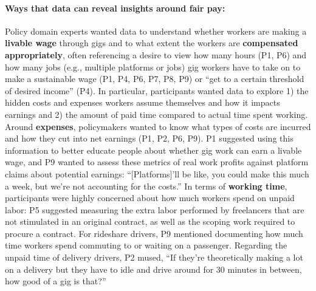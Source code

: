 \paragraph{{Ways that data can reveal insights around} fair pay: }\label{h.k49wp92meqn4}
{Policy domain experts} wanted data to understand {whether workers are making a \textbf{livable wage} through gig{s}} and to what extent the workers are \textbf{compensated appropriately}, often referencing a desire to view how many hours (P1, P6) and how many jobs (e.g., multiple platforms or jobs) gig workers have to take on to make a sustainable wage (P1, P4, P6, P7, P8, P9) or ``get to a certain threshold of desired income'' (P4). In particular, participants wanted data to explore  1) the hidden costs and expenses workers assume themselves and how it impacts earnings {and} 2) the amount of paid time compared to actual time spent working. Around \textbf{expenses}, {policymakers} wanted to know what {types of costs are incurred} and how they cut into net earnings (P1, P2, P6, P9). P1 suggested using this information to better educate people about whether gig work can earn a livable wage, and P9 wanted to assess these metrics of real work profits against platform claims about potential earnings: ``[Platforms]'ll be like, you could make this much a week, but we're not accounting for the costs.'' In terms of \textbf{working time}, participants were highly concerned about {how much} workers spend on unpaid labor: P5 suggested {measuring the extra labor performed by} freelancers that are not stimulated in an original contract, as well as the scoping work required to procure a contract. For rideshare drivers, P9 mentioned {documenting} how much time workers spend commuting to or waiting on a passenger. Regarding the unpaid time of delivery drivers, P2 mused, ``If they're theoretically making a lot on a delivery but they have to idle and drive around for 30 minutes in between, how good of a gig is that?'' 

